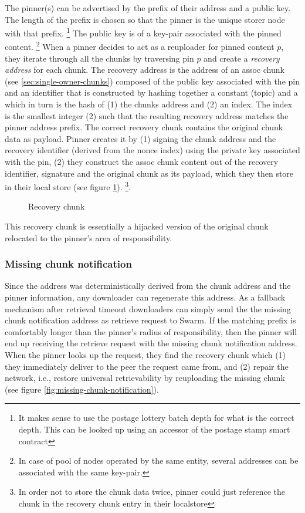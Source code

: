 The pinner(s) can be advertised by the prefix of their address and  a public key. The length of the prefix is chosen so that the pinner is the unique storer node with that prefix.%
%
\footnote{It makes sense to use the postage lottery batch depth for what is the correct depth. This can be looked up using an accessor of the postage stamp smart contract}
%
The public key is of a key-pair associated with the pinned content.%
%
\footnote{In case of pool of nodes operated by the same entity, several addresses can be associated with the same key-pair.}
%
When a pinner decides to act as a reuploader for pinned content $p$, they iterate through all the chunks by traversing pin $p$ and create a \emph{recovery address} for each chunk. The recovery address is the address of an assoc chunk (see \ref{sec:single-owner-chunks})  composed of the public key associated with the pin and an identifier that is constructed by hashing together a constant (topic) and a  which in turn is the hash of (1) the chunks address and (2) an index. The index is the smallest integer (2) such that the resulting recovery address matches the pinner address prefix. 
The correct recovery chunk contains the original chunk data as payload. Pinner creates it by (1) signing the chunk address and the recovery identifier (derived from the nonce index) using the private key associated with the pin, (2) they construct the assoc chunk content out of the recovery identifier, signature and the original chunk as its payload, which they then store in their local store (see figure \ref{fig:recovery-chunk}).%
\footnote{In order not to store the chunk data twice, pinner could just reference the chunk in the recovery chunk entry in their localstore}. 


\begin{figure}[htbp]
  \centering
  \caption[Recovery chunk]{Recovery chunk}
  \label{fig:recovery-chunk}
\end{figure}

This recovery chunk is essentially a hijacked version of the original chunk relocated to the pinner's area of responsibility. 

\subsubsection{Missing chunk notification}

Since the address was deterministically derived from the chunk address and the pinner information, any downloader can regenerate this address. As a fallback mechanism after retrieval timeout downloaders can simply send the the missing chunk notification address as retrieve request to Swarm. If the matching prefix is comfortably longer than the pinner's radius of responsibility, then the pinner will end up receiving the retrieve request with the missing chunk notification address. When the pinner looks up the request, they find the recovery chunk which (1) they immediately deliver to the peer the request came from, and (2) repair the network, i.e., restore universal retrievability by reuploading the missing chunk  (see figure \ref{fig:missing-chunk-notification}).  

